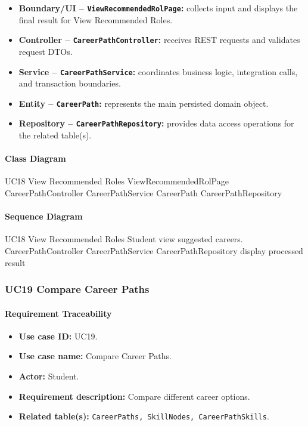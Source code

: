 \begin{itemize}
    \item \textbf{Boundary/UI -- \texttt{ViewRecommendedRolPage}:} collects input and displays the final result for View Recommended Roles.
    \item \textbf{Controller -- \texttt{CareerPathController}:} receives REST requests and validates request DTOs.
    \item \textbf{Service -- \texttt{CareerPathService}:} coordinates business logic, integration calls, and transaction boundaries.
    \item \textbf{Entity -- \texttt{CareerPath}:} represents the main persisted domain object.
    \item \textbf{Repository -- \texttt{CareerPathRepository}:} provides data access operations for the related table(s).
\end{itemize}

\paragraph{Class Diagram}

\ClassDiagram
{UC18 View Recommended Roles}
{ViewRecommendedRolPage}
{CareerPathController}
{CareerPathService}
{CareerPath}
{CareerPathRepository}

\paragraph{Sequence Diagram}

\SequenceDiagram
{UC18 View Recommended Roles}
{Student}
{view suggested careers.}
{CareerPathController}
{CareerPathService}
{CareerPathRepository}
{display processed result}

\subsubsection{UC19 Compare Career Paths}

\paragraph{Requirement Traceability}

\begin{itemize}
    \item \textbf{Use case ID:} UC19.
    \item \textbf{Use case name:} Compare Career Paths.
    \item \textbf{Actor:} Student.
    \item \textbf{Requirement description:} Compare different career options.
    \item \textbf{Related table(s):} \texttt{CareerPaths, SkillNodes, CareerPathSkills}.
\end{itemize}

